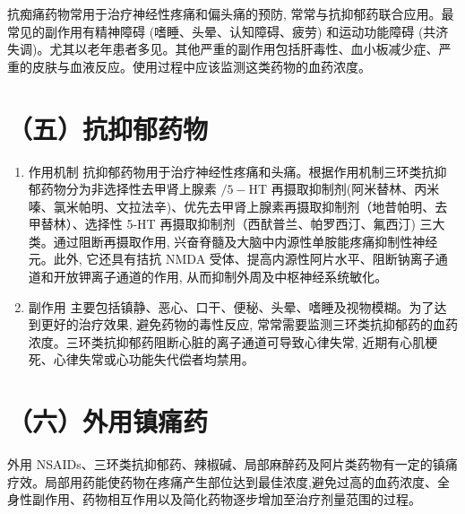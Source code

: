 \documentclass[10pt]{article}
\begin{document}
抗痴痛药物常用于治疗神经性疼痛和偏头痛的预防, 常常与抗抑郁药联合应用。最常见的副作用有精神障碍 (嗜睡、头晕、认知障碍、疲劳) 和运动功能障碍 (共济失调)。尤其以老年患者多见。其他严重的副作用包括肝毒性、血小板减少症、严重的皮肤与血液反应。使用过程中应该监测这类药物的血药浓度。

\section*{（五）抗抑郁药物}
\begin{enumerate}
  \item 作用机制 抗抑郁药物用于治疗神经性疼痛和头痛。根据作用机制三环类抗抑郁药物分为非选择性去甲肾上腺素 $/ 5-\mathrm{HT}$ 再摄取抑制剂(阿米替林、丙米嗪、氯米帕明、文拉法辛)、优先去甲肾上腺素再摄取抑制剂（地昔帕明、去甲替林）、选择性 5-HT 再摄取抑制剂（西䣭普兰、帕罗西汀、氟西汀) 三大类。通过阻断再摄取作用, 兴奋脊髓及大脑中内源性单胺能疼痛抑制性神经元。此外, 它还具有拮抗 NMDA 受体、提高内源性阿片水平、阻断钠离子通道和开放钾离子通道的作用, 从而抑制外周及中枢神经系统敏化。

  \item 副作用 主要包括镇静、恶心、口干、便秘、头晕、嗜睡及视物模糊。为了达到更好的治疗效果, 避免药物的毒性反应, 常常需要监测三环类抗抑郁药的血药浓度。三环类抗抑郁药阻断心脏的离子通道可导致心律失常, 近期有心肌梗死、心律失常或心功能失代偿者均禁用。

\end{enumerate}

\section*{（六）外用镇痛药}
外用 NSAIDs、三环类抗抑郁药、辣椒碱、局部麻醉药及阿片类药物有一定的镇痛疗效。局部用药能使药物在疼痛产生部位达到最佳浓度,避免过高的血药浓度、全身性副作用、药物相互作用以及简化药物逐步增加至治疗剂量范围的过程。
\end{document}
